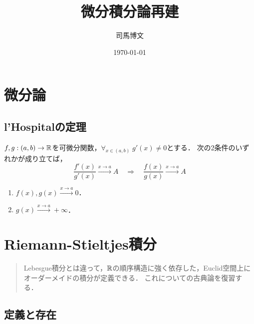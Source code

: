 \documentclass[uplatex, dvipdfmx]{jsreport}
\title{微分積分論再建}
\author{司馬博文}
\date{\today}
\begin{document}
\tableofcontents

\chapter{微分論}

\section{l'Hospitalの定理}

\begin{theorem}
    $f,g:(a,b)\to\mathbb{R}$を可微分関数，$\forall_{x\in(a,b)}\;g'(x)\ne0$とする．
    次の2条件のいずれかが成り立てば，
    \[\frac{f'(x)}{g'(x)}\xrightarrow{x\to a}A\quad\Rightarrow\quad\frac{f(x)}{g(x)}\xrightarrow{x\to a}A\]
    \begin{enumerate}
        \item $f(x),g(x)\xrightarrow{x\to a}0$．
        \item $g(x)\xrightarrow{x\to a}+\infty$．
    \end{enumerate}
\end{theorem}

\chapter{Riemann-Stieltjes積分}

\begin{quotation}
    Lebesgue積分とは違って，$\mathbb{R}$の順序構造に強く依存した，Euclid空間上にオーダーメイドの積分が定義できる．
    これについての古典論を復習する．
\end{quotation}

\section{定義と存在}
\end{document}
